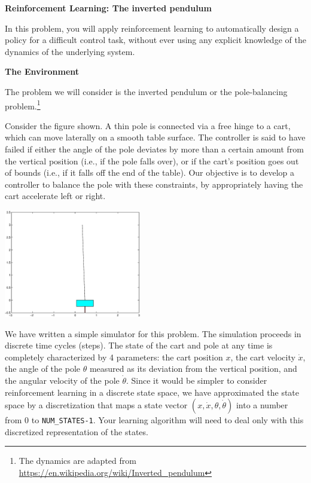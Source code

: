 \item {} {\bf Reinforcement Learning: The inverted pendulum}

In this problem, you will apply reinforcement learning to automatically
design a policy for a difficult control task, without ever using any 
explicit knowledge of the dynamics of the underlying system.

\textbf{The Environment}

The problem we will consider is the inverted pendulum or the pole-balancing 
problem.\footnote{The dynamics are adapted from
\url{https://en.wikipedia.org/wiki/Inverted_pendulum}}

Consider the figure shown. A thin pole is connected via a free hinge to a cart, 
which can move laterally on a smooth table surface. The controller is said to 
have failed if either the angle of the pole deviates by more than a certain
amount from the vertical position (i.e., if the pole falls over), or if the
cart's position goes out of bounds (i.e., if it falls off the end of the table).
Our objective is to develop a controller to balance the pole with these 
constraints, by appropriately having the cart accelerate left or right.


\begin{center}
  \includegraphics[width=6cm]{cartpole/cart_pole.eps}
\end{center}

We have written a simple simulator for this problem. The simulation 
proceeds in discrete time cycles (steps). The state of the cart and pole at any time 
is completely characterized by 4 parameters: the cart position $x$, the 
cart velocity $\dot{x}$, the angle of the pole $\theta$ measured as its deviation 
from the vertical position, and the angular velocity of the pole $\dot{\theta}$.  
Since it would be simpler to
consider reinforcement learning in a discrete state space,
we have approximated the state space by a discretization that maps 
a state vector $(x,\dot{x}, \theta, \dot{\theta})$ into a number
from 0 to {\tt NUM\_STATES-1}. Your learning algorithm will need to 
deal only with this discretized representation of the states.

